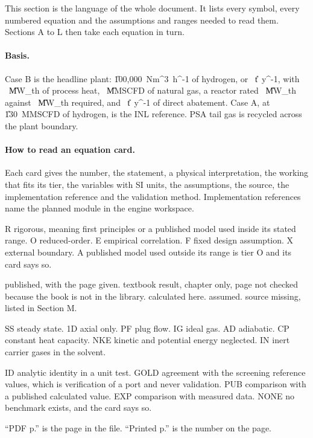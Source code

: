 This section is the language of the whole document. It lists every symbol, every numbered equation and the assumptions and ranges needed to read them. Sections A to L then take each equation in turn.

\paragraph{Basis.} Case B is the headline plant: \U{100{,}000\ Nm^3\ h^{-1}} of hydrogen, or \vMHtwoB~\U{t\ y^{-1}}, with \vQprocB~\U{MW_{th}} of process heat, \vNGB~\U{MMSCFD} of natural gas, a reactor rated \cQrated~\U{MW_{th}} against \vQRB~\U{MW_{th}} required, and \vAbateB~\U{t\ y^{-1}} of direct abatement. Case A, at \U{130\ MMSCFD} of hydrogen, is the INL reference. PSA tail gas is recycled across the plant boundary.

\paragraph{How to read an equation card.} Each card gives the number, the statement, a physical interpretation, the working that fits its tier, the variables with SI units, the assumptions, the source, the implementation reference and the validation method. Implementation references name the planned module in the engine workspace.

\begin{description}[leftmargin=1.2cm,itemsep=1pt,topsep=2pt]
\item[Tier] R rigorous, meaning first principles or a published model used inside its stated range. O reduced-order. E empirical correlation. F fixed design assumption. X external boundary. A published model used outside its range is tier O and its card says so.
\item[Evidence] \tagP{} published, with the page given. \tagT{} textbook result, chapter only, page not checked because the book is not in the library. \tagC{} calculated here. \tagA{} assumed.  source missing, listed in Section M.
\item[Assumption codes] SS steady state. 1D axial only. PF plug flow. IG ideal gas. AD adiabatic. CP constant heat capacity. NKE kinetic and potential energy neglected. IN inert carrier gases in the solvent.
\item[Validation codes] ID analytic identity in a unit test. GOLD agreement with the screening reference values, which is verification of a port and never validation. PUB comparison with a published calculated value. EXP comparison with measured data. NONE no benchmark exists, and the card says so.
\item[Page numbers] ``PDF p.'' is the page in the file. ``Printed p.'' is the number on the page.
\end{description}

